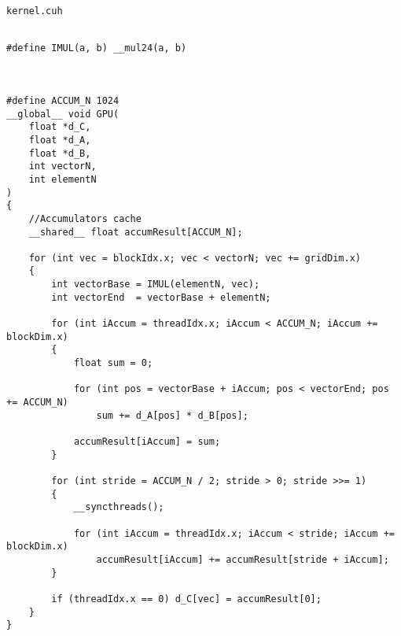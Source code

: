 \texttt{kernel.cuh}
\begin{lstlisting}[frame=single]  % Start your code-block

#define IMUL(a, b) __mul24(a, b)



#define ACCUM_N 1024
__global__ void GPU(
    float *d_C,
    float *d_A,
    float *d_B,
    int vectorN,
    int elementN
)
{
    //Accumulators cache
    __shared__ float accumResult[ACCUM_N];

    for (int vec = blockIdx.x; vec < vectorN; vec += gridDim.x)
    {
        int vectorBase = IMUL(elementN, vec);
        int vectorEnd  = vectorBase + elementN;

        for (int iAccum = threadIdx.x; iAccum < ACCUM_N; iAccum += blockDim.x)
        {
            float sum = 0;

            for (int pos = vectorBase + iAccum; pos < vectorEnd; pos += ACCUM_N)
                sum += d_A[pos] * d_B[pos];

            accumResult[iAccum] = sum;
        }

        for (int stride = ACCUM_N / 2; stride > 0; stride >>= 1)
        {
            __syncthreads();

            for (int iAccum = threadIdx.x; iAccum < stride; iAccum += blockDim.x)
                accumResult[iAccum] += accumResult[stride + iAccum];
        }

        if (threadIdx.x == 0) d_C[vec] = accumResult[0];
    }
}
\end{lstlisting}
